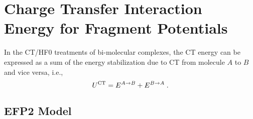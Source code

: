 \section{\label{s:3.ct}Charge Transfer Interaction Energy for Fragment Potentials}

In the CT/HF0 treatments of bi\hyp{}molecular complexes, the CT energy
can be expressed as a sum of the energy stabilization due to 
CT from molecule $A$ to $B$ and vice versa, i.e.,
%
\begin{equation} \label{e:ct-hf0}
 U^{\rm CT} =  E^{A\rightarrow B} + E^{B\rightarrow A}\;.
\end{equation}
%

\subsection{\label{ss:3.1.EFP2} EFP2 Model}

